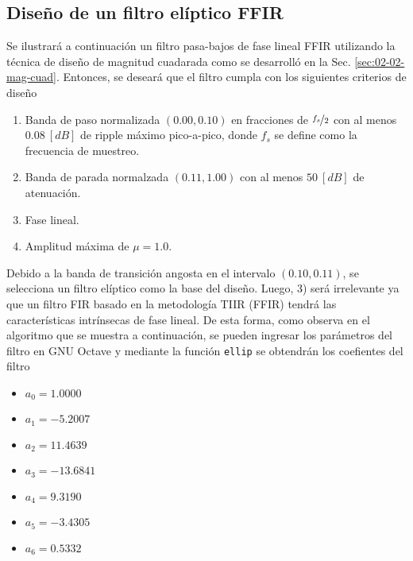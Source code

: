 \message{ !name(../main.tex)}\documentclass[journal,transmag]{IEEEtran}
\begin{document}
\subsection{Diseño de un filtro elíptico FFIR}
    Se ilustrará a continuación un filtro pasa-bajos de fase lineal FFIR
    utilizando la técnica de diseño de magnitud cuadarada como se desarrolló en
    la Sec. \ref{sec:02-02-mag-cuad}. Entonces, se deseará que el filtro cumpla
    con los siguientes criterios de diseño


    \begin{enumerate}
      \item Banda de paso normalizada $(0.00,0.10)$ en fracciones de
            $\nicefrac{f_{s}}{2}$ con al menos $0.08 \: [\unit{dB}]$ de ripple
            máximo pico-a-pico, donde $f_{s}$ se define como la frecuencia de
            muestreo.
      \item Banda de parada normalzada $(0.11,1.00)$ con al menos
            $50 \: [\unit{dB}]$ de atenuación.
      \item Fase lineal.
      \item Amplitud máxima de $\mu = 1.0$.

    \end{enumerate}

    Debido a la banda de transición angosta en el intervalo $(0.10,0.11)$, se
    selecciona un filtro elíptico como la base del diseño. Luego, 3) será
    irrelevante ya que un filtro FIR basado en la metodología TIIR (FFIR) tendrá
    las características intrínsecas de fase lineal. De esta forma, como
    observa en el algoritmo que se muestra a continuación, se pueden ingresar
    los parámetros del filtro en GNU Octave y mediante la función
    \lstinline|ellip| se obtendrán los coefientes del filtro

    

    \begin{itemize}
      \item $a_{0} = 1.0000$
      \item $a_{1} = -5.2007$
      \item $a_{2} = 11.4639$
      \item $a_{3} = -13.6841$
      \item $a_{4} = 9.3190$
      \item $a_{5} = -3.4305$
      \item $a_{6} = 0.5332$
    \end{itemize}
\end{document}
